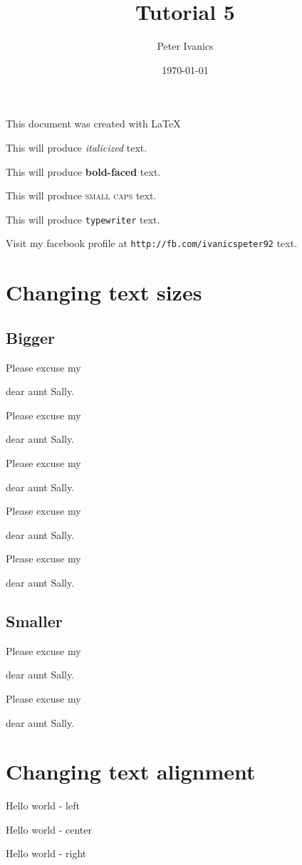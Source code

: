 \documentclass[11]{article}
\begin{document}
	\title{Tutorial 5}
	\author{Peter Ivanics}
	\date{\today}
	\maketitle
	
	\begin{center}
		This document was 	created with \LaTeX
	\end{center}	 
	
	This will produce \textit{italicized} text. 
	
	This will produce \textbf{bold-faced} text. 
	
	This will produce \textsc{small caps} text.
	 
	This will produce \texttt{typewriter} text. 
	
	Visit my facebook profile at \texttt{http://fb.com/ivanicspeter92} text. 
	
	\section{Changing text sizes}
		\subsection{Bigger}
		Please excuse my \begin{large}dear aunt Sally.\end{large}
	
		Please excuse my \begin{Large}dear aunt Sally.\end{Large}
	
		Please excuse my \begin{LARGE}dear aunt Sally.\end{LARGE}
	
		Please excuse my \begin{huge}dear aunt Sally.\end{huge}
	
		Please excuse my \begin{Huge}dear aunt Sally.\end{Huge}
	\subsection{Smaller}
	
		Please excuse my \begin{small}dear aunt Sally.\end{small}
	
		Please excuse my \begin{tiny}dear aunt Sally.\end{tiny} 
	
	\section{Changing text alignment}
	
	\begin{flushleft}Hello world - left\end{flushleft}
	\begin{center}Hello world - center\end{center}
	\begin{flushright}Hello world - right\end{flushright}
\end{document}
